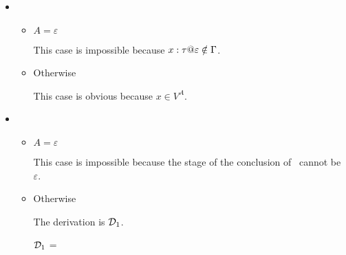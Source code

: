 \begin{itemize}
	\item \TVar
	      \begin{itemize}
	      	\item $ A = \varepsilon$
	      	      	      	      	      	      	      	      	      	      	      	      	      	      	      	      	      	      	      	      		      	      	      	      	      	      	      	      
	      	      This case is impossible because $x:\tau@\varepsilon \notin \G$.
	      	\item Otherwise
	      	      	      	      	      	      	      	      	      	      	      	      	      	      	      	      	      	      	      	      		      	      	      	      	      	      	      	      
	      	      This case is obvious because $x \in V^A$.
	      \end{itemize}
	      	      	      	      	      	      	      	      	      	      		      	      	      	      
	\item \TTBL
	      \begin{itemize}
	      	\item $ A = \varepsilon$
	      	      	      	      	      	      	      	      	      	      	      	      	      	      	      	      	      	      	      	      		      	      	      	      	      	      	      	      
	      	      This case is impossible because the stage of the conclusion of \TTBL\ cannot be $\varepsilon$.
	      	      	      	      	      	      	      	      	      	      	      	      	      	      	      	      	      	      	      	      		      	      	      	      	      	      	      	      
	      	\item Otherwise
	      	      	      	      	      	      	      	      	      	      	      	      	      	      	      	      	      	      	      	      		      	      	      	      	      	      	      	      
	      	      The derivation is $\mathcal{D}_1$.
	      	      	      	      	      	      	      	      	      	      	      	      	      	      	      	      	      	      	      	      		      	      	      	      	      	      	      	      
	      	      $\mathcal{D}_1$ = 
	      	      {}
	      	      	      	      	      	      	      	      	      	      	      	      	      	      	      	      	      	      	      	      		      	      	      	      	      	      	      	      

\end{itemize}
\end{itemize}
